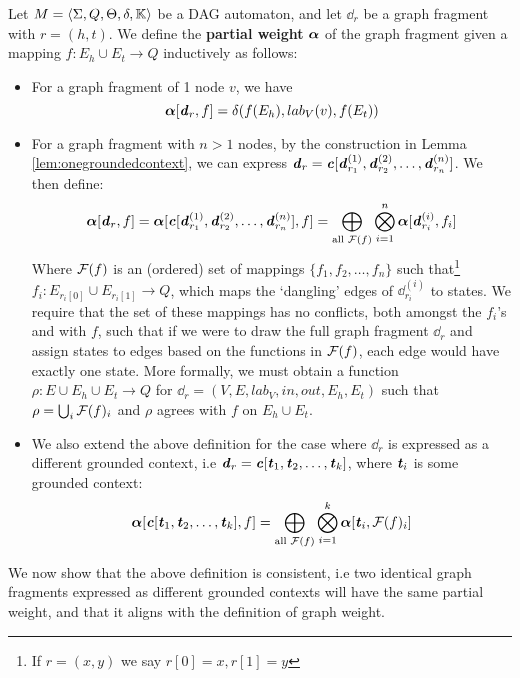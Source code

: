 \documentclass[11pt]{article}
\begin{document}
\begin{definition}\label{def:partialweight} Let $M = \langle
  \Sigma, Q, \Theta, \delta, \K \rangle$ be a DAG automaton, and let $\dd_r$ be
  a graph fragment with $r = (h,t)$. We define the \textbf{partial weight}
  $\aalpha$ of the graph fragment given a mapping $f: E_h \cup E_t \rightarrow
  Q$ inductively as follows:
  \begin{itemize}
    \item For a graph fragment of 1 node $v$, we have 
    \[
    \aalpha[\dd_r, f] = \delta(f(E_h), lab_V(v), f(E_t))
    \]

    \item For a graph fragment with $n > 1$ nodes, by the construction in Lemma
    \ref{lem:onegroundedcontext}, we can express $\dd_r = \cc[\dd^{(1)}_{r_1},
    \dd^{(2)}_{r_2},\ldots, \dd^{(n)}_{r_n}]$. We then define:
    \[
    \aalpha[\dd_r,f] = \aalpha[\cc[\dd^{(1)}_{r_1}, \dd^{(2)}_{r_2},\ldots,
    \dd^{(n)}_{r_n}],f] =  \bigoplus_{\text{all }\calF(f)} \bigotimes_{i=1}^n \aalpha[\dd^{(i)}_{r_i}, f_i]
    \]
    Where $\calF(f)$ is an (ordered) set of mappings $\{f_1,f_2,\ldots,f_n\}$
    such that\footnote{If $r = (x,y)$ we say $r[0] = x, r[1]=y$} $f_i:
    E_{r_i[0]} \cup E_{r_i[1]} \rightarrow Q$, which maps the `dangling' edges
    of $\dd^{(i)}_{r_i}$ to states. We require that the set of these mappings
    has no conflicts, both amongst the $f_i$'s and with $f$, such that if we
    were to draw the full graph fragment $\dd_r$ and assign states to edges
    based on the functions in $\calF(f)$, each edge would have exactly one
    state. More formally, we must obtain a function $\rho: E \cup E_h \cup E_t
    \rightarrow Q$ for $\dd_r = (V,E,lab_V,in,out,E_h,E_t)$ such that $\rho =
    \bigcup_i \calF(f)_i$ and $\rho$ agrees with $f$ on $E_h\cup E_t$.
    
    \item We also extend the above definition for the case where $\dd_r$ is
    expressed as a different grounded context, i.e $\dd_r = \cc[\tt_1,
    \tt_2,\ldots,\tt_k]$, where $\tt_i$ is some grounded context:
    \[
    \aalpha[\cc[\tt_1,\tt_2,\ldots,\tt_k],f] =  \bigoplus_{\text{all }\calF(f)} \bigotimes_{i=1}^k \aalpha[\tt_i, \calF(f)_i]
    \]
  \end{itemize}
  
\end{definition}

We now show that the above definition is consistent, i.e two identical graph
fragments expressed as different grounded contexts will have the same partial
weight, and that it aligns with the definition of graph weight. 
\end{document}
